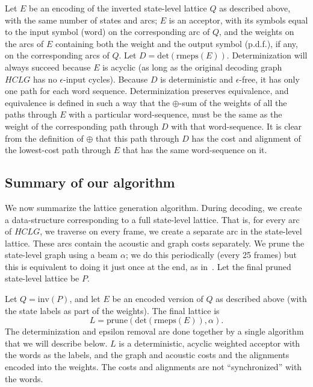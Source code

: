 \documentclass{article}
\def\HCLG{{\mathit{HCLG}}}
\def\inv{{\mathrm{inv}}}
\begin{document}
Let $E$ be an encoding of the inverted state-level lattice $Q$ 
as described above, with the same number of states and arcs; $E$ is an acceptor, with its symbols
equal to the input symbol (word) on the corresponding arc of $Q$, and
the weights on the arcs of $E$ containing both the weight and the output symbol (p.d.f.),
if any, on the corresponding arcs of $Q$.  Let $D = \mathrm{det}(\mathrm{rmeps}(E))$.
Determinization
will always succeed because $E$ is acyclic (as long as the original decoding
graph $\HCLG$ has no $\epsilon$-input cycles).  Because $D$ is deterministic
and $\epsilon$-free, it has only one path for each word sequence. 
Determinization preserves equivalence,
and equivalence is defined in such a way that the $\oplus$-sum of the
weights of all the paths through $E$ with a particular word-sequence, must be the same
as the weight of the corresponding path through $D$ with that word-sequence.
It is clear from the definition of $\oplus$ that this path through
$D$ has the cost and alignment of the lowest-cost path through $E$ that has the
same word-sequence on it.  

\subsection{Summary of our algorithm}

We now summarize the lattice generation algorithm.  During decoding, we create a data-structure
corresponding to a full state-level lattice.  That is, for every arc of $\HCLG$, we traverse
on every frame, we create a separate arc in the state-level lattice.  These arcs
contain the acoustic and graph costs separately.  We prune the state-level graph using
a beam $\alpha$; we do this periodically (every 25 frames) but this is equivalent to
doing it just once at the end, as in~\cite{efficient_general}.  Let the 
final pruned state-level lattice be $P$.

Let $Q = \inv(P)$, and let $E$ be an encoded version of $Q$ as described above (with the
state labels as part of the weights).  The final lattice is
\begin{equation}
   L = \mathrm{prune}(\mathrm{det}(\mathrm{rmeps}(E)), \alpha) .
\end{equation}
The determinization and epsilon removal are done together by a single algorithm
that we will describe below.  $L$ is a deterministic, acyclic weighted acceptor with the 
words as the labels, and the graph and acoustic costs and the alignments
encoded into the weights.  The costs and alignments are not ``synchronized'' 
with the words.
\end{document}
